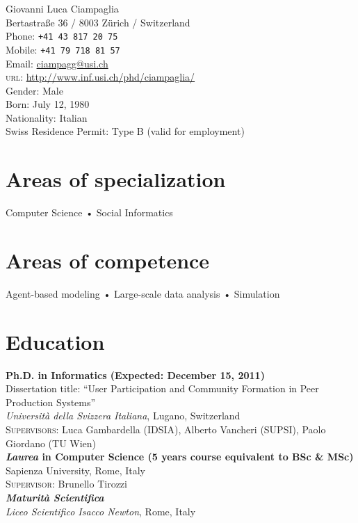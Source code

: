 \documentclass[10pt, a4paper]{article}
\newcommand{\years}[1]{\marginnote{\scriptsize #1}}
\begin{document}
{\LARGE Giovanni Luca Ciampaglia}\\[1cm]
Bertastraße 36 / 8003 Zürich / Switzerland\\[.2cm]
Phone: \texttt{+41 43 817 20 75}\\
Mobile: \texttt{+41 79 718 81 57}\\
Email: \href{mailto:ciampagg@usi.ch}{ciampagg@usi.ch}\\
\textsc{url}: \href{http://www.inf.usi.ch/phd/ciampaglia/}{http://www.inf.usi.ch/phd/ciampaglia/}\\[.2cm]
Gender: Male\\
Born:  July 12, 1980\\
Nationality: Italian\\
Swiss Residence Permit: Type B (valid for employment)

\section*{Areas of specialization}
Computer Science • Social Informatics  

\section*{Areas of competence}
Agent-based modeling • Large-scale data analysis • Simulation

\section*{Education}
\noindent
\years{2011}\textbf{Ph.D. in Informatics (Expected: December 15, 2011)}\\
Dissertation title: ``User Participation and Community Formation in Peer
Production Systems''\\
\textsl{Università della Svizzera Italiana}, Lugano, Switzerland\\
\textsc{Supervisors}: Luca Gambardella (IDSIA), Alberto Vancheri (SUPSI), Paolo
Giordano (TU Wien)\\[1em]
\years{2006}\textbf{\textsl{Laurea} in Computer Science (5 years course
equivalent to BSc \& MSc)}\\ Sapienza University, Rome, Italy\\
\textsc{Supervisor}: Brunello Tirozzi \\[1em]
\years{2000}\textbf{\textsl{Maturità Scientifica}}\\
\textsl{Liceo Scientifico Isacco Newton}, Rome, Italy\\
\end{document}
